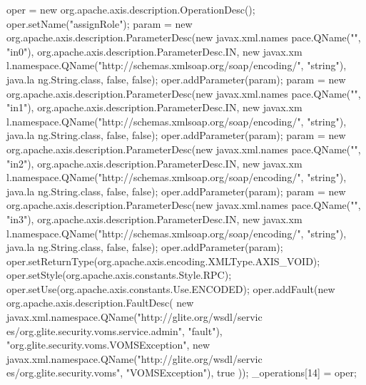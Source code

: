 \begin{DoxyCode}
{        oper = new org.apache.axis.description.OperationDesc();
        oper.setName("assignRole");
        param = new org.apache.axis.description.ParameterDesc(new javax.xml.names
      pace.QName("", "in0"), org.apache.axis.description.ParameterDesc.IN, new javax.xm
      l.namespace.QName("http://schemas.xmlsoap.org/soap/encoding/", "string"), java.la
      ng.String.class, false, false);
        oper.addParameter(param);
        param = new org.apache.axis.description.ParameterDesc(new javax.xml.names
      pace.QName("", "in1"), org.apache.axis.description.ParameterDesc.IN, new javax.xm
      l.namespace.QName("http://schemas.xmlsoap.org/soap/encoding/", "string"), java.la
      ng.String.class, false, false);
        oper.addParameter(param);
        param = new org.apache.axis.description.ParameterDesc(new javax.xml.names
      pace.QName("", "in2"), org.apache.axis.description.ParameterDesc.IN, new javax.xm
      l.namespace.QName("http://schemas.xmlsoap.org/soap/encoding/", "string"), java.la
      ng.String.class, false, false);
        oper.addParameter(param);
        param = new org.apache.axis.description.ParameterDesc(new javax.xml.names
      pace.QName("", "in3"), org.apache.axis.description.ParameterDesc.IN, new javax.xm
      l.namespace.QName("http://schemas.xmlsoap.org/soap/encoding/", "string"), java.la
      ng.String.class, false, false);
        oper.addParameter(param);
        oper.setReturnType(org.apache.axis.encoding.XMLType.AXIS_VOID);
        oper.setStyle(org.apache.axis.constants.Style.RPC);
        oper.setUse(org.apache.axis.constants.Use.ENCODED);
        oper.addFault(new org.apache.axis.description.FaultDesc(
                      new javax.xml.namespace.QName("http://glite.org/wsdl/servic
      es/org.glite.security.voms.service.admin", "fault"),
                      "org.glite.security.voms.VOMSException",
                      new javax.xml.namespace.QName("http://glite.org/wsdl/servic
      es/org.glite.security.voms", "VOMSException"), 
                      true
                     ));
        _operations[14] = oper;

}
\end{DoxyCode}
